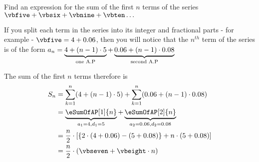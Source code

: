 \question[4] Find an expression for the sum of the first $n$ terms of the series 
$\vbfive + \vbsix + \vbnine + \vbten \ldots$

\watchout
{}

\ifprintanswers
\fi 

\begin{solution}[\halfpage]
  If you split each term in the series into its integer and fractional parts - for example - 
  $\vbfive = \vbone + \vbthree$, then you will notice that the $n^{th}$ term of the series
  is of the form $a_n = \underbrace{4 + (n-1)\cdot5}_{\text{one A.P}} + 
  \underbrace{0.06 + (n-1)\cdot0.08}_{\text{second A.P}} $
	
	The sum of the first $n$ terms therefore is
	\begin{align}
		S_n &= \sum_{k=1}^{n}(\vbone + (n-1)\cdot\vbtwo) + \sum_{k=1}^{n}(\vbthree + (n-1)\cdot\vbfour) \\
		&= \underbrace{\eSumOfAP[1]{n}}_{a_1=\vbone, d_1=\vbtwo} + \underbrace{\eSumOfAP[2]{n}}_{a_2=\vbthree, d_2=\vbfour} \\
		&= \dfrac{n}{2}\cdot\left[ \lbrace 2\cdot(\vbone + \vbthree) - (\vbtwo + \vbfour)\rbrace + n\cdot(\vbtwo + \vbfour) \right] \\
		&= \dfrac{n}{2}\cdot\left( \vbseven + \vbeight\cdot n\right)
	\end{align}
\end{solution}
